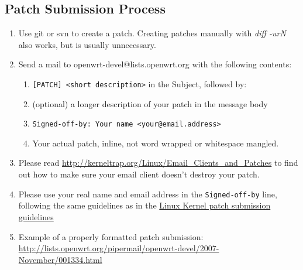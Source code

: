 \subsection{Patch Submission Process}
\begin{enumerate}
	\item Use git or svn to create a patch. Creating patches manually with 
		\textit{diff -urN} also works, but is usually unnecessary.
	\item Send a mail to openwrt-devel@lists.openwrt.org with the following contents:
	\begin{enumerate}
		\item \texttt{[PATCH] <short description>} in the Subject, followed by:
		\item (optional) a longer description of your patch in the message body
        \item \texttt{Signed-off-by: Your name <your@email.address>}
		\item Your actual patch, inline, not word wrapped or whitespace mangled. 
	\end{enumerate}
	\item Please read \href{http://kerneltrap.org/Linux/Email\_Clients\_and\_Patches}{http://kerneltrap.org/Linux/Email\_Clients\_and\_Patches}
		to find out how to make sure your email client doesn't destroy your patch.
	\item Please use your real name and email address in the \texttt{Signed-off-by}
		line, following the same guidelines as in the \href{http://git.kernel.org/?p=linux/kernel/git/torvalds/linux-2.6.git;a=blob;f=Documentation/SubmittingPatches;h=681e2b36195c98ea5271b76383b3a574b190b04f;hb=HEAD}{Linux Kernel patch submission guidelines}
	\item Example of a properly formatted patch submission: \\
	\href{http://lists.openwrt.org/pipermail/openwrt-devel/2007-November/001334.html}{http://lists.openwrt.org/pipermail/openwrt-devel/2007-November/001334.html}
\end{enumerate}
